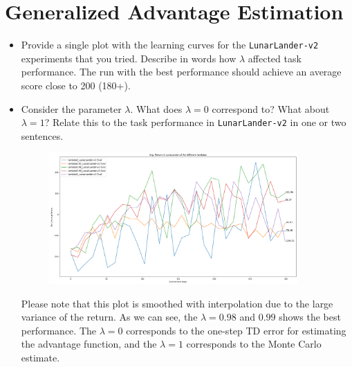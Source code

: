 \documentclass{article}
\begin{document}
\newpage\section{Generalized Advantage Estimation}
\begin{itemize}
    \item Provide a single plot with the learning curves for the \verb|LunarLander-v2| experiments that you tried. Describe in words how $\lambda$ affected task performance. The run with the best performance should achieve an average score close to 200 (180+).
    \item Consider the parameter $\lambda$. What does $\lambda = 0$ correspond to? What about $\lambda = 1$? Relate this to the task performance in \verb|LunarLander-v2| in one or two sentences.
    \begin{figure}[H]
        \centering
        \includegraphics[width=0.9\textwidth]{hw2_lambda.png}
    \end{figure}
    Please note that this plot is smoothed with interpolation due to the large variance of the return. As we can see, the $\lambda = 0.98$ and $0.99$ shows the best performance. The $\lambda = 0$ corresponds to the one-step TD error for estimating the advantage function, and the $\lambda = 1$ corresponds to the Monte Carlo estimate.
\end{itemize}
\end{document}
